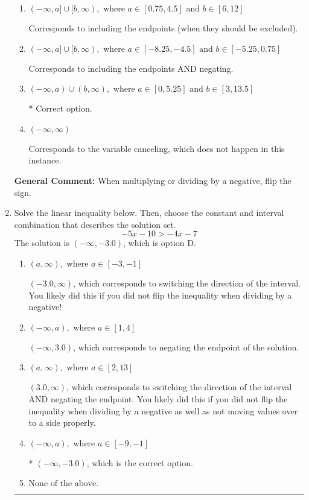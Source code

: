 \documentclass{extbook}[14pt]
\newcommand{\litem}[1]{\item #1

\rule{\textwidth}{0.4pt}}
\begin{document}
\begin{enumerate}
{\begin{enumerate}[label=\Alph*.]
Corresponds to inverting the inequality and negating the solution.
\item \( (-\infty, a] \cup [b, \infty), \text{ where } a \in [0.75, 4.5] \text{ and } b \in [6, 12] \)

Corresponds to including the endpoints (when they should be excluded).
\item \( (-\infty, a] \cup [b, \infty), \text{ where } a \in [-8.25, -4.5] \text{ and } b \in [-5.25, 0.75] \)

Corresponds to including the endpoints AND negating.
\item \( (-\infty, a) \cup (b, \infty), \text{ where } a \in [0, 5.25] \text{ and } b \in [3, 13.5] \)

 * Correct option.
\item \( (-\infty, \infty) \)

Corresponds to the variable canceling, which does not happen in this instance.
\end{enumerate}

\textbf{General Comment:} When multiplying or dividing by a negative, flip the sign.
}
\litem{
Solve the linear inequality below. Then, choose the constant and interval combination that describes the solution set.
\[ -5x -10 > -4x -7 \]The solution is \( (-\infty, -3.0) \), which is option D.\begin{enumerate}[label=\Alph*.]
\item \( (a, \infty), \text{ where } a \in [-3, -1] \)

 $(-3.0, \infty)$, which corresponds to switching the direction of the interval. You likely did this if you did not flip the inequality when dividing by a negative!
\item \( (-\infty, a), \text{ where } a \in [1, 4] \)

 $(-\infty, 3.0)$, which corresponds to negating the endpoint of the solution.
\item \( (a, \infty), \text{ where } a \in [2, 13] \)

 $(3.0, \infty)$, which corresponds to switching the direction of the interval AND negating the endpoint. You likely did this if you did not flip the inequality when dividing by a negative as well as not moving values over to a side properly.
\item \( (-\infty, a), \text{ where } a \in [-9, -1] \)

* $(-\infty, -3.0)$, which is the correct option.
\item \( \text{None of the above}. \)


\end{enumerate}}
\end{enumerate}
\end{document}
